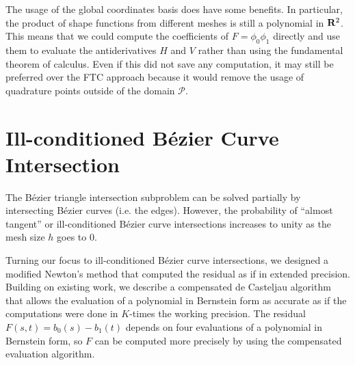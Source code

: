 The usage of the global coordinates basis does have some benefits.
In particular, the product of shape functions from different meshes
is still a polynomial in \(\mathbf{R}^2\). This means that we could
compute the coefficients of \(F = \phi_0 \phi_1\) directly and
use them to evaluate the antiderivatives \(H\) and \(V\) rather
than using the fundamental theorem of calculus. Even if this
did not save any computation, it may still be preferred over
the FTC approach because it would remove the usage of quadrature
points outside of the domain \(\mathcal{P}\).

\section{Ill-conditioned B\'{e}zier Curve Intersection}

The B\'{e}zier triangle intersection subproblem can be solved
partially by intersecting B\'{e}zier curves (i.e. the edges).
However, the probability of ``almost tangent'' or ill-conditioned
B\'{e}zier curve intersections increases to unity as the mesh
size \(h\) goes to \(0\).

Turning our focus to ill-conditioned B\'{e}zier curve intersections,
we designed a modified Newton's method that computed the residual
as if in extended precision. Building on existing work, we describe
a compensated de Casteljau algorithm that allows the evaluation of
a polynomial in Bernstein form as accurate as if the computations
were done in \(K\)-times the working precision. The residual
\(F(s, t) = b_0(s) - b_1(t)\) depends on four evaluations of
a polynomial in Bernstein form, so \(F\) can be computed more precisely
by using the compensated evaluation algorithm.
